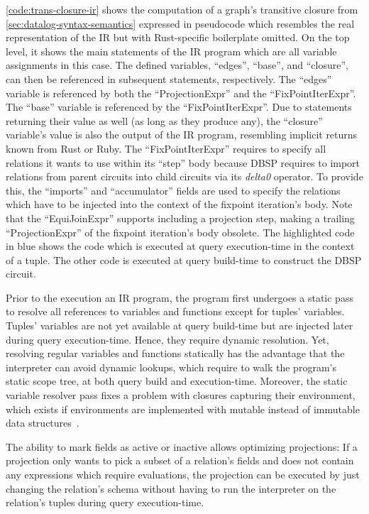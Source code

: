 \ref{code:trans-closure-ir} shows the computation of a graph's transitive closure
from \ref{sec:datalog-syntax-semantics} expressed in pseudocode which resembles
the real representation of the \ac{IR} but with Rust-specific boilerplate omitted.
On the top level, it shows the main statements of the \ac{IR} program which
are all variable assignments in this case.
The defined variables, ``edges'', ``base'', and ``closure'', can then be referenced
in subsequent statements, respectively.
The ``edges'' variable is referenced by both the ``ProjectionExpr'' and the
``FixPointIterExpr''.
The ``base'' variable is referenced by the ``FixPointIterExpr''.
Due to statements returning their value as well (as long as they produce any),
the ``closure'' variable's value is also the output of the \ac{IR} program,
resembling implicit returns known from Rust or Ruby.
The ``FixPointIterExpr'' requires to specify all relations it wants to use within
its ``step'' body because DBSP requires to import relations from parent circuits
into child circuits via its \emph{delta0} operator.
To provide this, the ``imports'' and ``accumulator'' fields are used to
specify the relations which have to be injected into the context of the fixpoint
iteration's body.
Note that the ``EquiJoinExpr'' supports including a projection step,
making a trailing ``ProjectionExpr'' of the fixpoint iteration's body obsolete.
The highlighted code in blue shows the code which is executed at query
execution-time in the context of a tuple.
The other code is executed at query build-time to construct the DBSP circuit.

Prior to the execution an \ac{IR} program, the program first undergoes a
static pass to resolve all references to variables and functions except for
tuples' variables.
Tuples' variables are not yet available at query build-time but are injected
later during query execution-time. Hence, they require dynamic resolution.
Yet, resolving regular variables and functions statically has the advantage that
the interpreter can avoid dynamic lookups, which require to walk the program's
static scope tree, at both query build and execution-time.
Moreover, the static variable resolver pass fixes a problem with closures
capturing their environment, which exists if environments are implemented with
mutable instead of immutable data structures~\cite{nystrom2021crafting}.

The ability to mark fields as active or inactive allows optimizing projections:
If a projection only wants to pick a subset of a relation's fields and does not
contain any expressions which require evaluations, the projection can be executed
by just changing the relation's schema without having to run the interpreter
on the relation's tuples during query execution-time.

